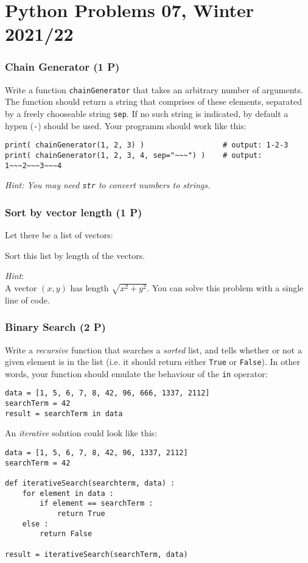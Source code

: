 \documentclass[
	ngerman,
	fontsize=10pt,
	parskip=half,
	titlepage=true,
	DIV=12
]{scrartcl}
\newcommand*{\inPy}[1]{\texttt{#1}}
\newcommand*{\ie}{i.\;e. }
\begin{document}
\part*{Python Problems 07, Winter 2021/22}

\section{Chain Generator (1 P)}
Write a function  \texttt{chainGenerator} that takes an arbitrary number of arguments. The function should return a string that comprises of these elements, separated by a freely chooseable string \texttt{sep}. If no such string is indicated, by default a hypen (\texttt{-}) should be used. Your programm should work like this:
\begin{verbatim}
print( chainGenerator(1, 2, 3) )                  # output: 1-2-3
print( chainGenerator(1, 2, 3, 4, sep="~~~") )    # output: 1~~~2~~~3~~~4
\end{verbatim}

\emph{Hint: You may need \inPy{str} to convert numbers to strings.}


\section{Sort by vector length (1 P)}
Let there be a list of vectors:

Sort this list by length of the vectors.

\emph{Hint}:\\
A vector $(x, y)$ has length $\sqrt{x^2 + y^2}$. You can solve this problem with a single line of code.


\section{Binary Search (2 P)}
Write a \emph{recursive} function that searches a \emph{sorted} list, and tells whether or not a given element is in the list (\ie it should return either \inPy{True} or \inPy{False}). In other words, your function should emulate the behaviour of the \inPy{in} operator:
\begin{verbatim}
data = [1, 5, 6, 7, 8, 42, 96, 666, 1337, 2112]
searchTerm = 42
result = searchTerm in data
\end{verbatim}

An \emph{iterative} solution could look like this:
\begin{verbatim}
data = [1, 5, 6, 7, 8, 42, 96, 1337, 2112]
searchTerm = 42

def iterativeSearch(searchterm, data) :
    for element in data :
        if element == searchTerm :
            return True
    else :
        return False

result = iterativeSearch(searchTerm, data)
\end{verbatim}
\end{document}
